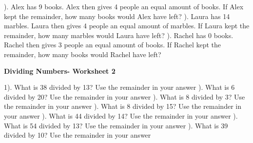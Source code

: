 \documentclass{article}%
\begin{document}
). Alex has 9 books. Alex then gives 4 people an equal amount of books. If Alex kept the remainder, how many books would Alex have left?%
\newline%
\newline%
). Laura has 14 marbles. Laura then gives 4 people an equal amount of marbles. If Laura kept the remainder, how many marbles would Laura have left?%
\newline%
\newline%
). Rachel has 0 books. Rachel then gives 3 people an equal amount of books. If Rachel kept the remainder, how many books would Rachel have left?%
\newline%
\newline%
\newline%
\pagebreak%
\large%
\begin{center}%
\textbf{Dividing Numbers- Worksheet 2}%
\newline%
\end{center} \normalsize%
1). What is 38 divided by 13? Use the remainder in your answer%
\newline%
\newline%
). What is 6 divided by 20? Use the remainder in your answer%
\newline%
\newline%
). What is 8 divided by 3? Use the remainder in your answer%
\newline%
\newline%
). What is 8 divided by 15? Use the remainder in your answer%
\newline%
\newline%
). What is 44 divided by 14? Use the remainder in your answer%
\newline%
\newline%
). What is 54 divided by 13? Use the remainder in your answer%
\newline%
\newline%
). What is 39 divided by 10? Use the remainder in your answer%
\newline%
\newline%
\end{document}
